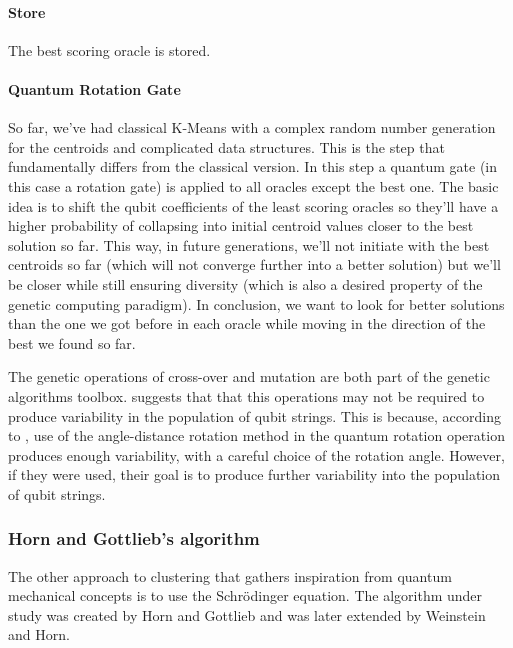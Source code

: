 \paragraph{Store}
The best scoring oracle is stored.

\paragraph{Quantum Rotation Gate}
So far, we've had classical K-Means with a complex random number generation for the centroids and complicated data structures. This is the step that fundamentally differs from the classical version. In this step a quantum gate (in this case a rotation gate) is applied to all oracles except the best one. The basic idea is to shift the qubit coefficients of the least scoring oracles so they'll have a higher probability of collapsing into initial centroid values closer to the best solution so far. This way, in future generations, we'll not initiate with the best centroids so far (which will not converge further into a better solution) but we'll be closer while still ensuring diversity (which is also a desired property of the genetic computing paradigm). In conclusion, we want to look for better solutions than the one we got before in each oracle while moving in the direction of the best we found so far.


The genetic operations of cross-over and mutation are both part of the genetic algorithms toolbox. \cite{Wiebe2014} suggests that that this operations may not be required to produce variability in the population of \gls{qubit} strings. This is because, according to \cite{Liu2010}, use of the angle-distance rotation method in the quantum rotation operation produces enough variability, with a careful choice of the rotation angle. However, if they were used, their goal is to produce further variability into the population of \gls{qubit} strings.



\subsubsection{Horn and Gottlieb's algorithm}

The other approach to clustering that gathers inspiration from quantum mechanical concepts is to use the Schrödinger equation. The algorithm under study was created by Horn and Gottlieb and was later extended by Weinstein and Horn.

